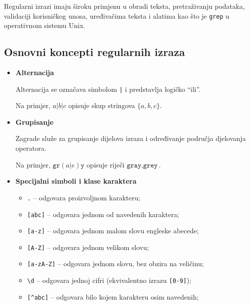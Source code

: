 Regularni izrazi imaju široku primjenu u obradi teksta, pretraživanju podataka, validaciji korisničkog unosa, uređivačima teksta i alatima kao što je \texttt{grep} u operativnom sistemu Unix.

\subsection{Osnovni koncepti regularnih izraza}

\begin{itemize}
	
	\item \textbf{Alternacija}
	
	Alternacija se označava simbolom \texttt{|} i predstavlja logičko ``ili''.
	
	Na primjer, 	$a|b|c $ opisuje skup stringova  $
	\{a,b,c\}.$
	
	\item \textbf{Grupisanje}
	
	Zagrade služe za grupisanje dijelova izraza i određivanje područja djelovanja operatora.
	
	Na primjer, $\texttt{gr}(a|e)\texttt{y}$ opisuje riječi $
	{\texttt{gray},\texttt{grey}}.
	$
	
	\item \textbf{Specijalni simboli i klase karaktera}
	
	\begin{itemize}
		
		\item \texttt{.} -- odgovara proizvoljnom karakteru;
		
		\item \texttt{[abc]} -- odgovara jednom od navedenih karaktera;
		
		\item \texttt{[a-z]} -- odgovara jednom malom slovu engleske abecede;
		
		\item \texttt{[A-Z]} -- odgovara jednom velikom slovu;
		
		\item \texttt{[a-zA-Z]} -- odgovara jednom slovu, bez obzira na veličinu;
		
		\item \texttt{\textbackslash d} -- odgovara jednoj cifri (ekvivalentno izrazu \texttt{[0-9]});
		
		\item \texttt{[\^{}abc]} -- odgovara bilo kojem karakteru osim navedenih;
		

\end{itemize}
\end{itemize}
